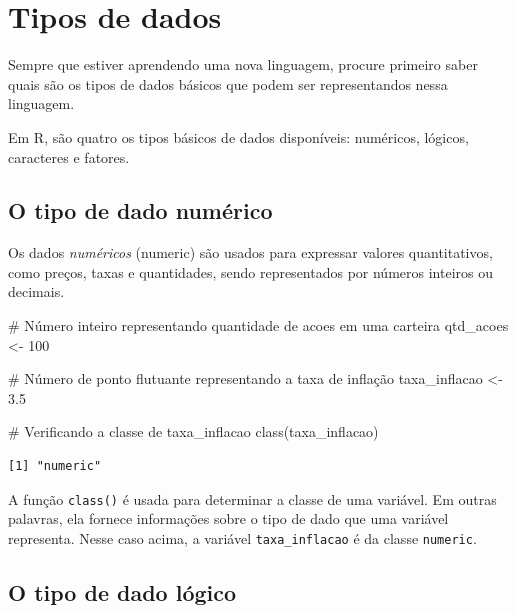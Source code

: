 \documentclass[
  letterpaper,
  DIV=11,
  numbers=noendperiod]{scrreprt}
\newenvironment{Shaded}{\begin{snugshade}}{\end{snugshade}}
\newcommand{\CommentTok}[1]{\textcolor[rgb]{0.37,0.37,0.37}{#1}}
\newcommand{\DecValTok}[1]{\textcolor[rgb]{0.68,0.00,0.00}{#1}}
\newcommand{\FloatTok}[1]{\textcolor[rgb]{0.68,0.00,0.00}{#1}}
\newcommand{\FunctionTok}[1]{\textcolor[rgb]{0.28,0.35,0.67}{#1}}
\newcommand{\NormalTok}[1]{\textcolor[rgb]{0.00,0.23,0.31}{#1}}
\newcommand{\OtherTok}[1]{\textcolor[rgb]{0.00,0.23,0.31}{#1}}
\begin{document}
\hypertarget{sec-tipodedados}{%
\section{Tipos de dados}\label{sec-tipodedados}}

Sempre que estiver aprendendo uma nova linguagem, procure primeiro saber
quais são os tipos de dados básicos que podem ser representandos nessa
linguagem.

Em R, são quatro os tipos básicos de dados disponíveis: numéricos,
lógicos, caracteres e fatores.

\hypertarget{sec-tipodedados-num}{%
\subsection{O tipo de dado numérico}\label{sec-tipodedados-num}}

Os dados \emph{numéricos} (numeric) são usados para expressar valores
quantitativos, como preços, taxas e quantidades, sendo representados por
números inteiros ou decimais.

\begin{Shaded}
\begin{Highlighting}[]
\CommentTok{\# Número inteiro representando quantidade de acoes em uma carteira}
\NormalTok{qtd\_acoes }\OtherTok{\textless{}{-}} \DecValTok{100}

\CommentTok{\# Número de ponto flutuante representando a taxa de inflação}
\NormalTok{taxa\_inflacao }\OtherTok{\textless{}{-}} \FloatTok{3.5}

\CommentTok{\# Verificando a classe de taxa\_inflacao}
\FunctionTok{class}\NormalTok{(taxa\_inflacao)}
\end{Highlighting}
\end{Shaded}

\begin{verbatim}
[1] "numeric"
\end{verbatim}

A função \texttt{class()} é usada para determinar a classe de uma
variável. Em outras palavras, ela fornece informações sobre o tipo de
dado que uma variável representa. Nesse caso acima, a variável
\texttt{taxa\_inflacao} é da classe \texttt{numeric}.

\hypertarget{o-tipo-de-dado-luxf3gico}{%
\subsection{O tipo de dado lógico}\label{o-tipo-de-dado-luxf3gico}}
\end{document}
